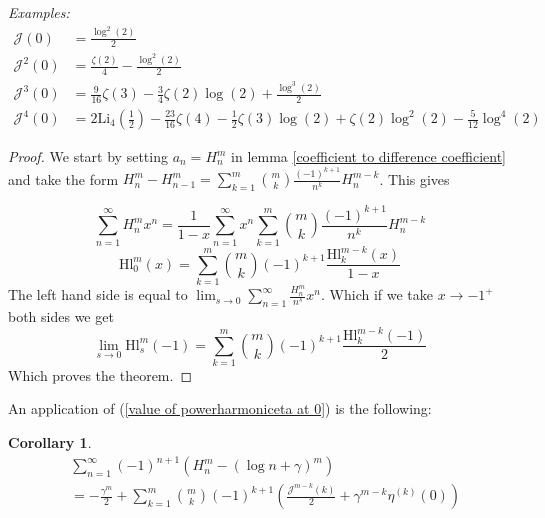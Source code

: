 \documentclass{article}
\newcommand{\powerharmonicetafunction}[2]{{\mathcal{J}}^{#1}(#2)}
\newcommand{\powerhl}[3]{\mathrm{Hl}_{#1}^{#2}(#3)}
\newtheorem{corollary}[theorem]{Corollary}
\begin{document}
    \textit{Examples:} \[\begin{split}
        \mathcal{J}(0) &= \frac{\log^2(2)}{2} \\
        \mathcal{J}^2(0)&= \frac{\zeta(2)}{4}-\frac{\log^2(2)}{2}\\
        \mathcal{J}^3(0)&= \frac{9}{16}\zeta(3)-\frac{3}{4}\zeta(2)\log(2)+\frac{\log^3(2)}{2}\\ 
        \mathcal{J}^4(0) &= 2\mathrm{Li}_4\left(\frac{1}{2}\right)-\frac{23}{16}\zeta(4)-\frac{1}{2}\zeta(3)\log(2)+\zeta(2)\log^2(2)-\frac{5}{12}\log^4(2)
    \end{split}\]
    \begin{proof}
We start by setting $a_n=H_n^m$ in lemma \ref{coefficient to difference coefficient} and take the form $H_n^m-H_{n-1}^m=\sum_{k=1}^m \binom{m}{k}\frac{(-1)^{k+1}}{n^k}H_n^{m-k}$. This gives

    \[\sum_{n=1}^{\infty} H_n^m x^n =\frac{1}{1-x}\sum_{n=1}^{\infty} x^n \sum_{k=1}^m \binom{m}{k}\frac{(-1)^{k+1}}{n^k}H_n^{m-k}\]
    \begin{equation}\label{harmonic power generating function in terms of lower weights}
\powerhl{0}{m}{x}=\sum_{k=1}^m \binom{m}{k} (-1)^{k+1}\frac{\powerhl{k}{m-k}{x}}{1-x}
    \end{equation}
    The left hand side is equal to $\lim_{s\to 0}\sum_{n=1}^{\infty} \frac{H_n^m}{n^s} x^n$.  Which if we take $x\to -1^{+}$ both sides we get
    \[\lim_{s\to 0}\powerhl{s}{m}{-1}=\sum_{k=1}^m \binom{m}{k} (-1)^{k+1}\frac{\powerhl{k}{m-k}{-1}}{2}\]
    Which proves the theorem.
    \end{proof}
    An application of (\ref{value of powerharmoniceta at 0}) is the following:
\begin{corollary}\label{Alternating harmonic power sum}
\begin{equation}\label{Alternation version of unsolved problem}\begin{split}
    &\sum_{n=1}^{\infty}(-1)^{n+1}\left(H_n^m-(\log n+\gamma)^m\right) \\ & =-\frac{\gamma^m}{2}+\sum_{k=1}^{m}\binom{m}{k}(-1)^{k+1}\left(\frac{\powerharmonicetafunction{m-k}{k}}{2}+\gamma^{m-k}\eta^{(k)}(0)\right)\end{split}
\end{equation}
\end{corollary}
\end{document}

